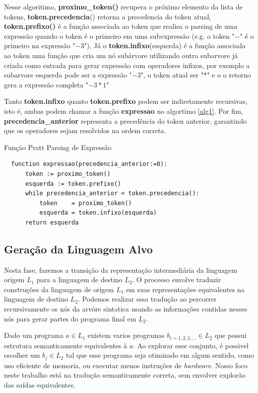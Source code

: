 \documentclass[english, 
               brazil, 
               bsc] %
               {dcomp-abntex2}
\begin{document}
Nesse algoritimo, 
\textbf{proximo\_token()} recupera o próximo elemento da lista de tokens,
\textbf{token.precedencia}() retorna a precedencia do token atual, \textbf{token.prefixo()} é a função associada ao token que realisa o parsing de uma expressão quando o token é o primeiro em uma subexpressão (e.g. o token "$-$" é o primeiro na expressão "$-3$"). Já o   
\textbf{token.infixo}(esquerda) é a função associada ao token uma função que cria um nó subárvore utilizando outra subarvore já criada como entrada para gerar expressão com operadores infixos, por exemplo a subarvore esquerda pode ser a expressão "$-3$", o token atual ser "$*$" e o o retorno gera a expressão completa "$-3 * 1$"

Tanto \textbf{token.infixo} quanto \textbf{token.prefixo} podem ser indiretamente recursivas, isto é, ambas podem chamar a função \textbf{expressao} no algortimo \ref{alg1}. 
Por fim, \textbf{precedencia\_anterior} representa a precedência do token anterior, garantindo que os operadores sejam resolvidos na ordem correta.

\begin{algoritmo}[H]
	\caption{Função Pratt Parsing de Expressão}
	\label{alg1}
	\label{alg1}
  \begin{lstlisting}
  function expressao(precedencia_anterior:=0):
      token := proximo_token()
      esquerda := token.prefixo()
      while precedencia_anterior < token.precedencia():
          token    = proximo_token()
          esquerda = token.infixo(esquerda)
      return esquerda
  \end{lstlisting}
\end{algoritmo}

\subsection{Geração da Linguagem Alvo}

Nesta fase, fazemos a transição da representação intermediária  da linguagem origem \( L_1 \)  para  a linguagem de destino \( L_2 \). O processo envolve traduzir construções da linguagem de origem \( L_1 \) em suas representações equivalentes na linguagem de destino \( L_2 \). Podemos realizar essa tradução ao percorrer recursivamente os nós da arvóre sintatica usando as informações contidas nesses nós para gerar partes do programa final em $L_2$.

Dado um programa $a \in L_1$ existem varios programas $b_{i=1,2,3,...} \in L_2$ que possui estrutura semanticamente equivalentes à $a$. Ao explorar esse conjunto, é possivel escolher um $b_j \in L_2$ tal que esse programa seja otimizado em algum sentido, como uso eficiente de memoria, ou executar menos instruções de \textit{hardware}. Nosso foco neste trabalho está na tradução semanticamente correta, sem envolver explorão das saídas  equivalentes.
\end{document}
